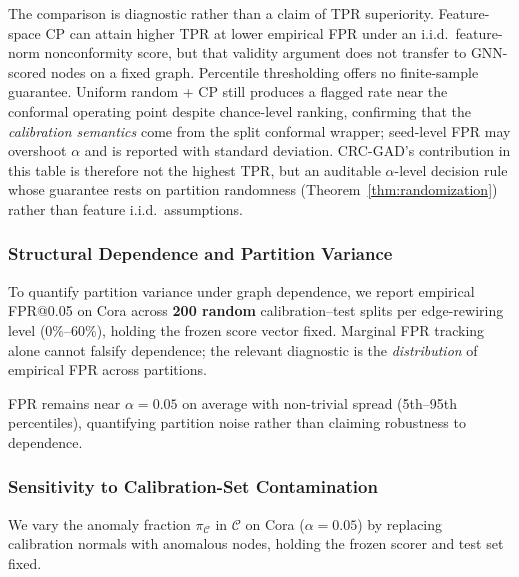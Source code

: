 \documentclass[a4paper]{cas-dc}
\theoremstyle{definition}
\begin{document}
The comparison is diagnostic rather than a claim of TPR superiority. Feature-space CP can attain higher TPR at lower empirical FPR under an i.i.d.\ feature-norm nonconformity score, but that validity argument does not transfer to GNN-scored nodes on a fixed graph. Percentile thresholding offers no finite-sample guarantee. Uniform random + CP still produces a flagged rate near the conformal operating point despite chance-level ranking, confirming that the \emph{calibration semantics} come from the split conformal wrapper; seed-level FPR may overshoot $\alpha$ and is reported with standard deviation. CRC-GAD's contribution in this table is therefore not the highest TPR, but an auditable $\alpha$-level decision rule whose guarantee rests on partition randomness (Theorem~\ref{thm:randomization}) rather than feature i.i.d.\ assumptions.

\subsubsection{Structural Dependence and Partition Variance}
\label{sec:abl_dependence}

To quantify partition variance under graph dependence, we report empirical FPR@0.05 on Cora across \textbf{200 random} calibration--test splits per edge-rewiring level (0\%--60\%), holding the frozen score vector fixed. Marginal FPR tracking alone cannot falsify dependence; the relevant diagnostic is the \emph{distribution} of empirical FPR across partitions.

\begin{table}[pos=t]
\centering
\caption{FPR@0.05 variance under edge rewiring + 200 random splits per seed (Cora; mean over seeds $\{0,\ldots,4\}$).}
\label{tab:dependence}
\footnotesize
\setlength{\tabcolsep}{2.5pt}

\end{table}

FPR remains near $\alpha=0.05$ on average with non-trivial spread (5th--95th percentiles), quantifying partition noise rather than claiming robustness to dependence.

\subsubsection{Sensitivity to Calibration-Set Contamination}
\label{sec:abl_contamination}

We vary the anomaly fraction $\pi_{\mathcal{C}}$ in $\mathcal{C}$ on Cora ($\alpha=0.05$) by replacing calibration normals with anomalous nodes, holding the frozen scorer and test set fixed.
\end{document}

